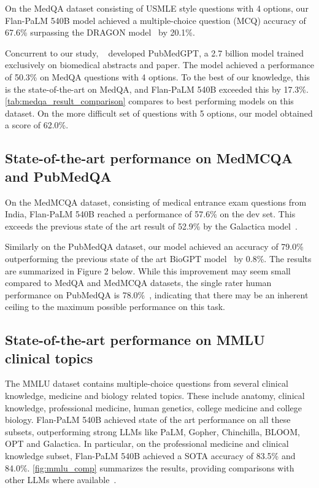 On the MedQA dataset consisting of USMLE style questions with 4 options, our Flan-PaLM 540B model achieved a multiple-choice question (MCQ) accuracy of 67.6\% surpassing the DRAGON model~\cite{yasunaga2022deep} by 20.1\%. 

Concurrent to our study, ~\citet{bolton2022pubmedgpt} developed PubMedGPT, a 2.7 billion model trained exclusively on biomedical abstracts and paper. The model achieved a performance of 50.3\% on MedQA questions with 4 options. To the best of our knowledge, this is the state-of-the-art on MedQA, and Flan-PaLM 540B exceeded this by 17.3\%. \ref{tab:medqa_result_comparison} compares to best performing models on this dataset. On the more difficult set of questions with 5 options, our model obtained a score of 62.0\%.

\subsection{State-of-the-art performance on MedMCQA and PubMedQA}

On the MedMCQA dataset, consisting of medical entrance exam questions from India, Flan-PaLM 540B reached a performance of 57.6\% on the dev set. This exceeds the previous state of the art result of 52.9\% by the Galactica model~\cite{taylor2022galactica}. 

Similarly on the PubMedQA dataset, our model achieved an accuracy of 79.0\% outperforming the previous state of the art BioGPT model~\citet{luo2022biogpt} by 0.8\%. The results are summarized in Figure 2 below. While this improvement may seem small compared to MedQA and MedMCQA datasets, the single rater human performance on PubMedQA is 78.0\%~\cite{jin2021disease}, indicating that there may be an inherent ceiling to the maximum possible performance on this task.

\subsection{State-of-the-art performance on MMLU clinical topics}

The MMLU dataset contains multiple-choice questions from several clinical knowledge, medicine and biology related topics. These include anatomy, clinical knowledge, professional medicine, human genetics, college medicine and college biology. Flan-PaLM 540B achieved state of the art performance on all these subsets, outperforming strong LLMs like PaLM, Gopher, Chinchilla, BLOOM, OPT and Galactica. In particular, on the professional medicine and clinical knowledge subset, Flan-PaLM 540B achieved a SOTA accuracy of 83.5\% and 84.0\%. \ref{fig:mmlu_comp} summarizes the results, providing comparisons with other LLMs where available~\cite{taylor2022galactica}.

